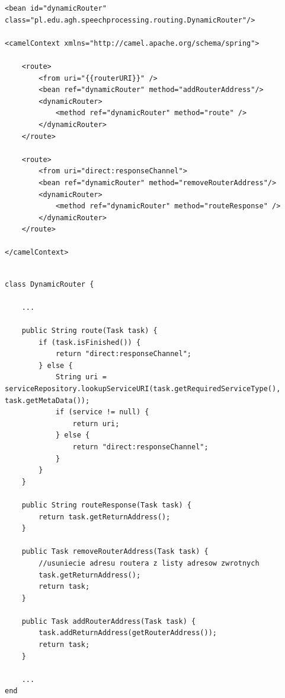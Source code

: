 
\begin{center}
\begin{lstlisting}
<bean id="dynamicRouter" class="pl.edu.agh.speechprocessing.routing.DynamicRouter"/>

<camelContext xmlns="http://camel.apache.org/schema/spring">

	<route>
		<from uri="{{routerURI}}" />
		<bean ref="dynamicRouter" method="addRouterAddress"/>
		<dynamicRouter>
			<method ref="dynamicRouter" method="route" />
		</dynamicRouter>
	</route>

	<route>
		<from uri="direct:responseChannel">
		<bean ref="dynamicRouter" method="removeRouterAddress"/>
		<dynamicRouter>
			<method ref="dynamicRouter" method="routeResponse" />
		</dynamicRouter>
	</route>

</camelContext>

\end{lstlisting}
\end{center}

\lstset{language=Java, tabsize=4, caption=Implementacja metody routującej wiadomości do odpowiednich komponentów przetwarzania mowy.,label=lst:router_impl}

\begin{center}
\begin{lstlisting}

class DynamicRouter {

	...

	public String route(Task task) {
		if (task.isFinished()) {
			return "direct:responseChannel";
		} else {
			String uri = serviceRepository.lookupServiceURI(task.getRequiredServiceType(), task.getMetaData());
			if (service != null) {
				return uri;
			} else {
				return "direct:responseChannel";
			}
		}
	}

	public String routeResponse(Task task) {
		return task.getReturnAddress();
	}

	public Task removeRouterAddress(Task task) {
		//usuniecie adresu routera z listy adresow zwrotnych
		task.getReturnAddress();
		return task;
	}

	public Task addRouterAddress(Task task) {
		task.addReturnAddress(getRouterAddress());
		return task;
	}

	...
end
\end{lstlisting}
\end{center}


